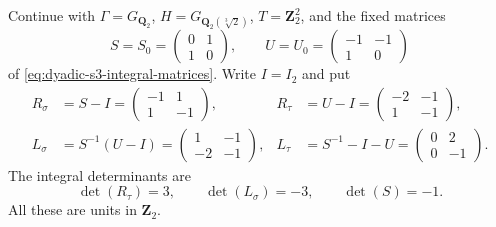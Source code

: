 \documentclass[11pt]{article}
\theoremstyle{definition}
\begin{document}
Continue with $\Gamma=G_{\mathbf Q_2}$,
$H=G_{\mathbf Q_2(\sqrt[3]{2})}$,
$T=\mathbf Z_2^2$, and the fixed matrices
\[
S=S_0=\begin{pmatrix}0&1\\1&0\end{pmatrix},
\qquad
U=U_0=\begin{pmatrix}-1&-1\\1&0\end{pmatrix}
\]
of \eqref{eq:dyadic-s3-integral-matrices}.
Write $I=I_2$ and put
\begin{equation}\label{eq:dyadic-s3-natural-tame-blocks}
\begin{aligned}
R_\sigma&=S-I=
\begin{pmatrix}-1&1\\1&-1\end{pmatrix},
&
R_\tau&=U-I=
\begin{pmatrix}-2&-1\\1&-1\end{pmatrix},
\\
L_\sigma&=S^{-1}(U-I)
=\begin{pmatrix}1&-1\\-2&-1\end{pmatrix},
&
L_\tau&=S^{-1}-I-U
=\begin{pmatrix}0&2\\0&-1\end{pmatrix}.
\end{aligned}
\end{equation}
The integral determinants are
\begin{equation}\label{eq:dyadic-s3-natural-unit-dets}
\det(R_\tau)=3,\qquad
\det(L_\sigma)=-3,\qquad
\det(S)=-1.
\end{equation}
All these are units in $\mathbf Z_2$.
\end{document}
